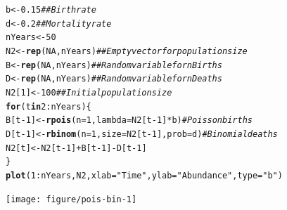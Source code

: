 \documentclass[12pt]{article}\usepackage[]{graphicx}\usepackage[]{xcolor}
\makeatletter
\newcommand{\hlnum}[1]{\textcolor[rgb]{0.686,0.059,0.569}{#1}}%
\newcommand{\hlsng}[1]{\textcolor[rgb]{0.192,0.494,0.8}{#1}}%
\newcommand{\hlcom}[1]{\textcolor[rgb]{0.678,0.584,0.686}{\textit{#1}}}%
\newcommand{\hlopt}[1]{\textcolor[rgb]{0,0,0}{#1}}%
\newcommand{\hldef}[1]{\textcolor[rgb]{0.345,0.345,0.345}{#1}}%
\newcommand{\hlkwa}[1]{\textcolor[rgb]{0.161,0.373,0.58}{\textbf{#1}}}%
\newcommand{\hlkwb}[1]{\textcolor[rgb]{0.69,0.353,0.396}{#1}}%
\newcommand{\hlkwc}[1]{\textcolor[rgb]{0.333,0.667,0.333}{#1}}%
\newcommand{\hlkwd}[1]{\textcolor[rgb]{0.737,0.353,0.396}{\textbf{#1}}}%
\newenvironment{kframe}{%
 \def\at@end@of@kframe{}%
 \ifinner\ifhmode%
  \def\at@end@of@kframe{\end{minipage}}%
  \begin{minipage}{\columnwidth}%
 \fi\fi%
 \def\FrameCommand##1{\hskip\@totalleftmargin \hskip-\fboxsep
 \colorbox{shadecolor}{##1}\hskip-\fboxsep
     \hskip-\linewidth \hskip-\@totalleftmargin \hskip\columnwidth}%
 \MakeFramed {\advance\hsize-\width
   \@totalleftmargin\z@ \linewidth\hsize
   \@setminipage}}%
 {\par\unskip\endMakeFramed%
 \at@end@of@kframe}
\newenvironment{knitrout}{}{} %
\makeatother
\begin{document}
\begin{knitrout}
\color{fgcolor}\begin{kframe}
\begin{alltt}
\hldef{b} \hlkwb{<-} \hlnum{0.15}  \hlcom{## Birth rate}
\hldef{d} \hlkwb{<-} \hlnum{0.2}   \hlcom{## Mortality rate}
\hldef{nYears} \hlkwb{<-} \hlnum{50}
\hldef{N2} \hlkwb{<-} \hlkwd{rep}\hldef{(}\hlnum{NA}\hldef{, nYears)}  \hlcom{## Empty vector for population size }
\hldef{B} \hlkwb{<-} \hlkwd{rep}\hldef{(}\hlnum{NA}\hldef{, nYears)}   \hlcom{## Random variable for nBirths}
\hldef{D} \hlkwb{<-} \hlkwd{rep}\hldef{(}\hlnum{NA}\hldef{, nYears)}   \hlcom{## Random variable for nDeaths}
\hldef{N2[}\hlnum{1}\hldef{]} \hlkwb{<-} \hlnum{100}           \hlcom{## Initial population size}
\hlkwa{for}\hldef{(t} \hlkwa{in} \hlnum{2}\hlopt{:}\hldef{nYears) \{}
    \hldef{B[t}\hlopt{-}\hlnum{1}\hldef{]} \hlkwb{<-} \hlkwd{rpois}\hldef{(}\hlkwc{n}\hldef{=}\hlnum{1}\hldef{,} \hlkwc{lambda}\hldef{=N2[t}\hlopt{-}\hlnum{1}\hldef{]}\hlopt{*}\hldef{b)}      \hlcom{# Poisson births}
    \hldef{D[t}\hlopt{-}\hlnum{1}\hldef{]} \hlkwb{<-} \hlkwd{rbinom}\hldef{(}\hlkwc{n}\hldef{=}\hlnum{1}\hldef{,} \hlkwc{size}\hldef{=N2[t}\hlopt{-}\hlnum{1}\hldef{],} \hlkwc{prob}\hldef{=d)} \hlcom{# Binomial deaths}
    \hldef{N2[t]} \hlkwb{<-} \hldef{N2[t}\hlopt{-}\hlnum{1}\hldef{]} \hlopt{+} \hldef{B[t}\hlopt{-}\hlnum{1}\hldef{]} \hlopt{-} \hldef{D[t}\hlopt{-}\hlnum{1}\hldef{]}
\hldef{\}}
\hlkwd{plot}\hldef{(}\hlnum{1}\hlopt{:}\hldef{nYears, N2,} \hlkwc{xlab}\hldef{=}\hlsng{"Time"}\hldef{,} \hlkwc{ylab}\hldef{=}\hlsng{"Abundance"}\hldef{,} \hlkwc{type}\hldef{=}\hlsng{"b"}\hldef{)}
\end{alltt}
\end{kframe}

{\centering \texttt{[image: figure/pois-bin-1]} 

}


\end{knitrout}
\end{document}
